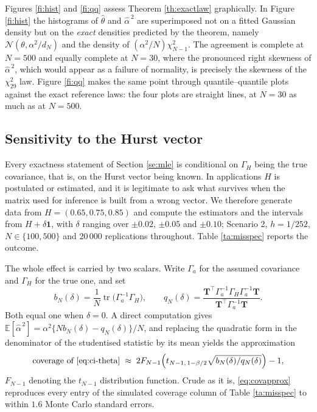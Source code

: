 \documentclass[11pt,reqno]{amsart}
\numberwithin{equation}{section}
\theoremstyle{plain}
\theoremstyle{definition}
\theoremstyle{remark}
\newcommand{\bT}{\mathbf{T}}
\newcommand{\bone}{\mathbf{1}}
\newcommand{\GH}{\Gamma_H}
\newcommand{\E}{\mathbb{E}}
\newcommand{\Norm}{\mathcal{N}}
\DeclareMathOperator{\tr}{tr}
\begin{document}
Figures \ref{fi:hist} and \ref{fi:qq} assess Theorem \ref{th:exactlaw} graphically. In
Figure \ref{fi:hist} the histograms of $\widehat\theta$ and $\widehat\alpha^{\,2}$ are
superimposed not on a fitted Gaussian density but on the \emph{exact} densities predicted
by the theorem, namely $\Norm(\theta,\alpha^{2}/d_N)$ and the density of
$(\alpha^{2}/N)\chi^{2}_{N-1}$. The agreement is complete at $N=500$ and equally complete
at $N=30$, where the pronounced right skewness of $\widehat\alpha^{\,2}$, which would
appear as a failure of normality, is precisely the skewness of the $\chi^{2}_{29}$
law. Figure \ref{fi:qq} makes the same point through quantile--quantile plots against the
exact reference laws: the four plots are straight lines, at $N=30$ as much as at $N=500$.

\subsection{Sensitivity to the Hurst vector}\label{sse:misspec}

Every exactness statement of Section \ref{se:mle} is conditional on $\GH$ being the true
covariance, that is, on the Hurst vector being known. In applications $H$ is postulated
or estimated, and it is legitimate to ask what survives when the matrix used for
inference is built from a wrong vector. We therefore generate data from
$H=(0.65,0.75,0.85)$ and compute the estimators and the intervals from
$H+\delta\bone$, with $\delta$ ranging over $\pm0.02$, $\pm0.05$ and $\pm0.10$;
Scenario 2, $h=1/252$, $N\in\{100,500\}$ and $20\,000$ replications throughout.
Table \ref{ta:misspec} reports the outcome.

The whole effect is carried by two scalars. Write $\Gamma_{\!a}$ for the assumed
covariance and $\GH$ for the true one, and set
\begin{equation}\label{eq:bq}
b_N(\delta)=\frac1N\tr\bigl(\Gamma_{\!a}^{-1}\GH\bigr),\qquad
q_N(\delta)=\frac{\bT^{\top}\Gamma_{\!a}^{-1}\GH\Gamma_{\!a}^{-1}\bT}
                 {\bT^{\top}\Gamma_{\!a}^{-1}\bT}.
\end{equation}
Both equal one when $\delta=0$. A direct computation gives
$\E[\widehat\alpha^{\,2}]=\alpha^{2}\{Nb_N(\delta)-q_N(\delta)\}/N$, and replacing the
quadratic form in the denominator of the studentised statistic by its mean yields the
approximation
\begin{equation}\label{eq:covapprox}
\text{coverage of \eqref{eq:ci-theta}}\;\approx\;
2F_{N-1}\Bigl(t_{N-1,\,1-\beta/2}\sqrt{b_N(\delta)/q_N(\delta)}\Bigr)-1,
\end{equation}
$F_{N-1}$ denoting the $t_{N-1}$ distribution function. Crude as it is,
\eqref{eq:covapprox} reproduces every entry of the simulated coverage column of
Table \ref{ta:misspec} to within $1.6$ Monte Carlo standard errors.
\end{document}
